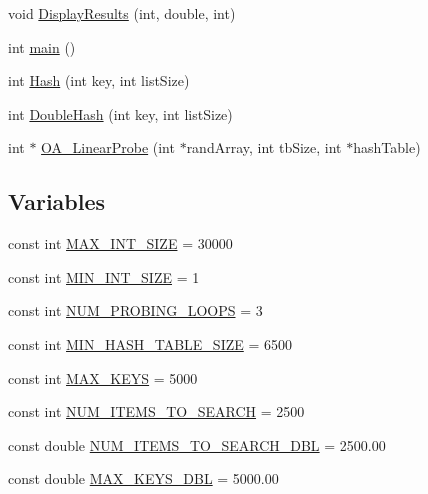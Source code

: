 \begin{DoxyCompactItemize}
\item 
void \hyperlink{_bradshaw-_mansfield-_assn2-_h_a_s_h_prog_8cpp_ac833bf25caea2f934fd8d75e2986997c}{DisplayResults} (int, double, int)
\item 
int \hyperlink{_bradshaw-_mansfield-_assn2-_h_a_s_h_prog_8cpp_ae66f6b31b5ad750f1fe042a706a4e3d4}{main} ()
\item 
int \hyperlink{_bradshaw-_mansfield-_assn2-_h_a_s_h_prog_8cpp_ae9957e8e2a204d621e9f9cc2999adf56}{Hash} (int key, int listSize)
\item 
int \hyperlink{_bradshaw-_mansfield-_assn2-_h_a_s_h_prog_8cpp_aba56e572dc851c7863847efa4a3a1f22}{DoubleHash} (int key, int listSize)
\item 
int $\ast$ \hyperlink{_bradshaw-_mansfield-_assn2-_h_a_s_h_prog_8cpp_aa342d426f7a6fa643a100ba04bc8e46e}{OA\_\-LinearProbe} (int $\ast$randArray, int tbSize, int $\ast$hashTable)
\end{DoxyCompactItemize}
\subsection*{Variables}
\begin{DoxyCompactItemize}
\item 
const int \hyperlink{_bradshaw-_mansfield-_assn2-_h_a_s_h_prog_8cpp_a80697a51c12117a5eae4ada58d27e1c2}{MAX\_\-INT\_\-SIZE} = 30000
\item 
const int \hyperlink{_bradshaw-_mansfield-_assn2-_h_a_s_h_prog_8cpp_a2e30ee6cd6a71066a4c99da7204c73bd}{MIN\_\-INT\_\-SIZE} = 1
\item 
const int \hyperlink{_bradshaw-_mansfield-_assn2-_h_a_s_h_prog_8cpp_ac3e309d0e80c3dd569ed3cfb701075a8}{NUM\_\-PROBING\_\-LOOPS} = 3
\item 
const int \hyperlink{_bradshaw-_mansfield-_assn2-_h_a_s_h_prog_8cpp_a92e00f871716652e494af2741a4794bd}{MIN\_\-HASH\_\-TABLE\_\-SIZE} = 6500
\item 
const int \hyperlink{_bradshaw-_mansfield-_assn2-_h_a_s_h_prog_8cpp_ad2624222b2a41e40f795baff70c1d20c}{MAX\_\-KEYS} = 5000
\item 
const int \hyperlink{_bradshaw-_mansfield-_assn2-_h_a_s_h_prog_8cpp_a02ce5f32cab205c8455bd8b976085c50}{NUM\_\-ITEMS\_\-TO\_\-SEARCH} = 2500
\item 
const double \hyperlink{_bradshaw-_mansfield-_assn2-_h_a_s_h_prog_8cpp_ad619de5a53a38d732b9c5da01523a23e}{NUM\_\-ITEMS\_\-TO\_\-SEARCH\_\-DBL} = 2500.00
\item 
const double \hyperlink{_bradshaw-_mansfield-_assn2-_h_a_s_h_prog_8cpp_a3a0ca86f28ff2c4d31143f5f3d6ca40a}{MAX\_\-KEYS\_\-DBL} = 5000.00
\end{DoxyCompactItemize}


